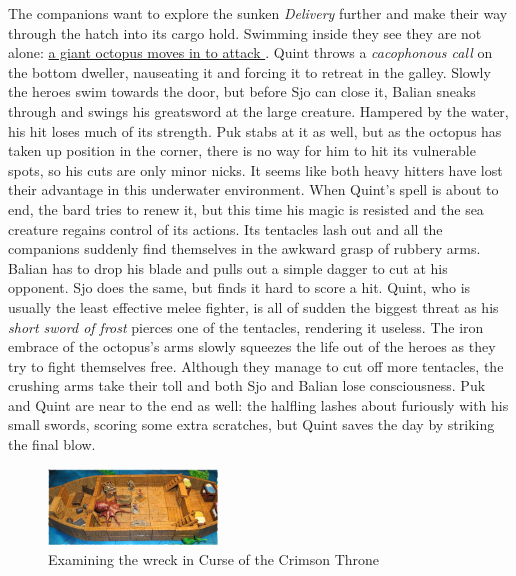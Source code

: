 The companions want to explore the sunken {\itshape Delivery} further and make their way through the hatch into its cargo hold. Swimming inside they see they are not alone: \hyperref[fig:Examining-the-wreck-in-Curse-of-the-Crimson-Throne-504554608]{ a giant octopus moves in to attack } . Quint throws a  {\itshape cacophonous call} on the bottom dweller, nauseating it and forcing it to retreat in the galley. Slowly the heroes swim towards the door, but before Sjo can close it, Balian sneaks through and swings his greatsword at the large creature. Hampered by the water, his hit loses much of its strength. Puk stabs at it as well, but as the octopus has taken up position in the corner, there is no way for him to hit its vulnerable spots, so his cuts are only minor nicks. It seems like both heavy hitters have lost their advantage in this underwater environment. When Quint's spell is about to end, the bard tries to renew it, but this time his magic is resisted and the sea creature regains control of its actions. Its tentacles lash out and all the companions suddenly find themselves in the awkward grasp of rubbery arms. Balian has to drop his blade and pulls out a simple dagger to cut at his opponent. Sjo does the same, but finds it hard to score a hit. Quint, who is usually the least effective melee fighter, is all of sudden the biggest threat as his  {\itshape short sword of frost} pierces one of the tentacles, rendering it useless. The iron embrace of the octopus's arms slowly squeezes the life out of the heroes as they try to fight themselves free. Although they manage to cut off more tentacles, the crushing arms take their toll and both Sjo and Balian lose consciousness. Puk and Quint are near to the end as well: the halfling lashes about furiously with his small swords, scoring some extra scratches, but Quint saves the day by striking the final blow. \\

\begin{figure}[h]
	\centering
	\includegraphics[width=0.4\textwidth]{images/Examining-the-wreck-in-Curse-of-the-Crimson-Throne-504554608_mod.jpg}
	\caption{Examining the wreck in Curse of the Crimson Throne}
	\label{fig:Examining-the-wreck-in-Curse-of-the-Crimson-Throne-504554608}
\end{figure}

